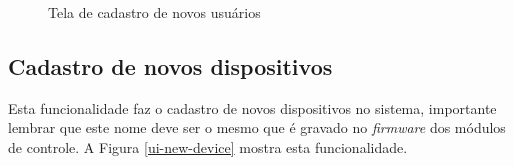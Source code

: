 \begin{figure}[H]
\caption{\label{ui-new-user} Tela de cadastro de novos usuários}
\end{figure}

\subsection{Cadastro de novos dispositivos}
Esta funcionalidade faz o cadastro de novos dispositivos no sistema, importante lembrar que este nome deve ser o mesmo que é gravado no \textit{firmware} dos módulos de controle. A Figura \ref{ui-new-device} mostra esta funcionalidade.

